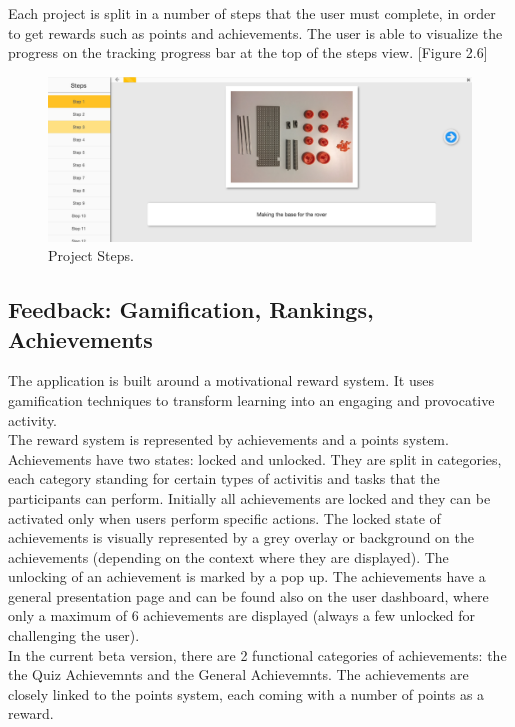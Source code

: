 Each project is split in a number of steps that the user must complete, in order to get rewards such as points and achievements. The user is able to visualize the progress on the tracking progress bar at the top of the steps view. [Figure 2.6] 

\begin{figure}
\includegraphics[width=1\linewidth]{images/ui/ProjectSteps.png}
\caption{Project Steps.}
\label{fig:project_steps}
\end{figure}


\subsection{Feedback: Gamification, Rankings, Achievements}

The application is built around a motivational reward system. It uses gamification techniques to transform learning into an engaging and provocative activity. \\

The reward system is represented by achievements and a points system. Achievements have two states: locked and unlocked. They are split in categories, each category standing for certain types of activitis and tasks that the participants can perform. Initially all achievements are locked and they can be activated only when users perform specific actions. The locked state of achievements is visually represented by a grey overlay or background on the achievements (depending on the context where they are displayed). The unlocking of an achievement is marked by a pop up. The achievements have a general presentation page and can be found also on the user dashboard, where only a maximum of 6 achievements are displayed (always a few unlocked for challenging the user).\\

In the current beta version, there are 2 functional categories of achievements: the the Quiz Achievemnts and the General Achievemnts. The achievements are closely linked to the points system, each coming with a number of points as a reward.\\

